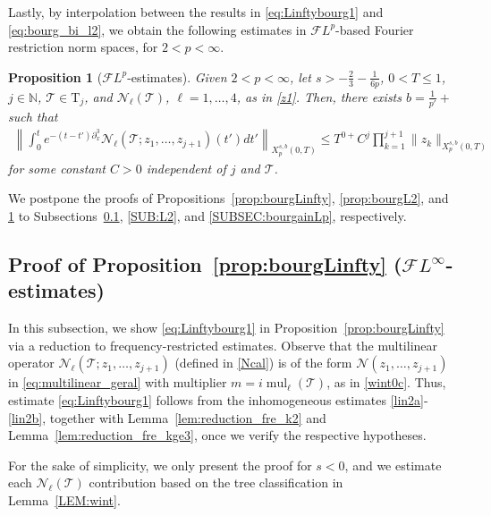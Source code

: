 \documentclass[a4paper,
11pt,  reqno]{amsart}
\newcommand{\5}{\textup{V}}
\newcommand{\FL}{\mathcal{F} L}
\newcommand{\dx}{\partial_x}
\newtheorem{proposition}[theorem]{Proposition}
\theoremstyle{remark}
\newcommand{\TT}{\mathcal{T}}
\newcommand{\Tr}{\mathrm{T}}
\renewcommand{\l}{\ell}
\newcommand{\N}{\mathbb{N}}
\DeclareMathOperator{\mul}{mul}
\numberwithin{equation}{section}
\numberwithin{theorem}{section}
\newcommand{\Ncal}{\mathcal{N}}
\begin{document}
Lastly, by interpolation between the results in \eqref{eq:Linftybourg1} and \eqref{eq:bourg_bi_l2}, we obtain the following estimates in $\FL^{p}$-based Fourier restriction norm spaces, for $2 < p <\infty$. 




\begin{proposition}[$\FL^p$-estimates]\label{prop:bourgLp}
Given $2 < p <\infty$, let $s>-\frac{2}{3}-\frac{1}{6p}$, $0<T \le 1$, $j\in\N$,  $\TT\in \Tr_{j}$, and $\Ncal_\l(\TT)$, $\l=1,\dots, 4$, as in \eqref{z1}. Then,
there exists $b=\frac{1}{p'}+$ such that
	\begin{align}\label{eq:bourg_bi_lp}
		\left\|\int_0^t e^{-(t-t')\dx^3} \Ncal_\l(\TT; z_1,\dots, z_{j+1})(t') dt'  \right\|_{X^{s,b}_{p}(0,T)} 
        \le T^{0+} C^j\prod_{k=1}^{j+1}\|z_k\|_{X^{s,b}_{p}(0,T)}
	\end{align}
    for some constant $C>0$ independent of $j$ and $\TT$.
\end{proposition}




We postpone the proofs of Propositions~\ref{prop:bourgLinfty}, \ref{prop:bourgL2}, and \ref{prop:bourgLp} to Subsections~\ref{SUB:Linfty}, \ref{SUB:L2}, and \ref{SUBSEC:bourgainLp}, respectively. 




\subsection{Proof of Proposition~\ref{prop:bourgLinfty} ($\FL^\infty$-estimates)}
\label{SUB:Linfty}



{
In this subsection, we show \eqref{eq:Linftybourg1} in Proposition~\ref{prop:bourgLinfty} via a reduction to frequency-restricted estimates. 
Observe that the multilinear operator   
$\Ncal_\l(\TT; z_1, \ldots, z_{j+1})$ (defined in \eqref{Ncal}) is of the form $\Ncal(z_1, \ldots, z_{j+1})$ in \eqref{eq:multilinear_geral} with multiplier $m=i \mul_\l(\TT)$, as in \eqref{wint0c}. 
 Thus, estimate  \eqref{eq:Linftybourg1}  follows from the inhomogeneous estimates \eqref{lin2a}-\eqref{lin2b}, together with Lemma~\ref{lem:reduction_fre_k2} and Lemma~\ref{lem:reduction_fre_kge3}, once we verify the respective hypotheses. 
 
 For the sake of simplicity, we only present the proof for $s<0$, and we estimate each $\Ncal_\l(\TT)$ contribution based on the tree classification in Lemma~\ref{LEM:wint}.
}
\end{document}
